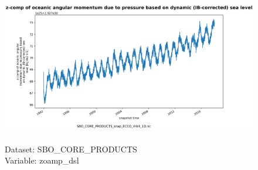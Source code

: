 \begin{figure}[H]
\centering
\includegraphics[scale=0.5]{../images/plots/oneD_plots/SBO_Core_Products/zoamp_dsl.png}
\caption{\\Dataset: SBO\_CORE\_PRODUCTS\\Variable: zoamp\_dsl}
\label{tab:table-SBO_CORE_PRODUCTS_zoamp_dsl-Plot}
\end{figure}
\pagebreak
